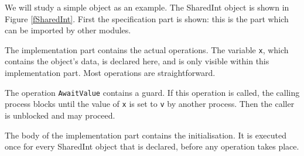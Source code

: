 We will study a simple object as an example. The SharedInt object
is shown in Figure \ref{fSharedInt}. First the specification part is
shown: this is the part which can be imported by other modules. 

The implementation part contains the actual operations. The variable
{\tt x}, which contains the object's data, is declared here, and is only
visible within this implementation part. Most operations are
straightforward. 

The operation {\tt AwaitValue} contains a guard. If this
operation is called, the calling process blocks until the value of 
{\tt x} is set to {\tt v} by another process.
Then the caller is unblocked and may proceed.

The body of the implementation part contains the initialisation. It is
executed once for every SharedInt object that is declared, before any
operation takes place.


